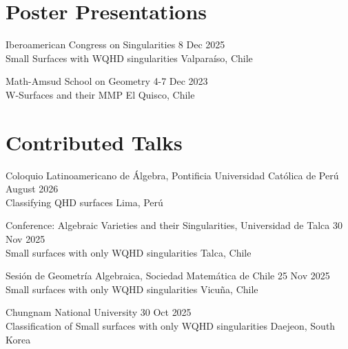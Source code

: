 \newcommand{\playsymbol}{$\blacktriangleright$}
\section{\sc Poster Presentations}
\begin{etaremune}
\item
  Iberoamerican Congress on Singularities
  \hfill{}
  8 Dec 2025\\
  Small Surfaces with WQHD singularities
  \hfill{}
  Valparaíso, Chile
    \item
  Math-Amsud School on Geometry
  \hfill{}
  4-7 Dec 2023\\
  W-Surfaces and their MMP
  \hfill{}
  El Quisco, Chile
\end{etaremune}
\section{Contributed Talks}
\secstartswithlist{}%
\begin{etaremune}
\item
  Coloquio Latinoamericano de Álgebra, Pontificia Universidad Católica de Perú
  \hfill{}
  August 2026\\
  Classifying QHD surfaces
  \hfill{}
  Lima, Perú
\item
  Conference: Algebraic Varieties and their Singularities, Universidad de Talca
  \hfill{}
  30 Nov 2025\\
  Small surfaces with only WQHD singularities
  \hfill{}
  Talca, Chile
\item
  Sesión de Geometría Algebraica, Sociedad Matemática de Chile
  \hfill{}
  25 Nov 2025\\
  Small surfaces with only WQHD singularities
  \hfill{}
  Vicuña, Chile
\item
  Chungnam National University
  \hfill{}
  30 Oct 2025\\
  Classification of Small surfaces with only WQHD singularities
  \hfill{}
  Daejeon, South Korea
\end{etaremune}

